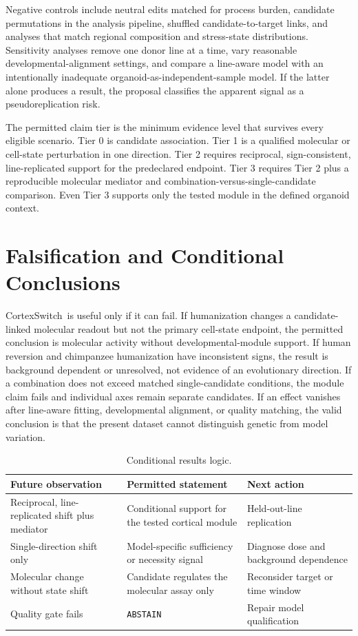 \documentclass[conference]{IEEEtran}
\newcommand{\csw}{CortexSwitch}
\newcommand{\abstain}{\texttt{ABSTAIN}}
\begin{document}
Negative controls include neutral edits matched for process burden, candidate permutations in the analysis pipeline, shuffled candidate-to-target links, and analyses that match regional composition and stress-state distributions. Sensitivity analyses remove one donor line at a time, vary reasonable developmental-alignment settings, and compare a line-aware model with an intentionally inadequate organoid-as-independent-sample model. If the latter alone produces a result, the proposal classifies the apparent signal as a pseudoreplication risk.

The permitted claim tier is the minimum evidence level that survives every eligible scenario. Tier 0 is candidate association. Tier 1 is a qualified molecular or cell-state perturbation in one direction. Tier 2 requires reciprocal, sign-consistent, line-replicated support for the predeclared endpoint. Tier 3 requires Tier 2 plus a reproducible molecular mediator and combination-versus-single-candidate comparison. Even Tier 3 supports only the tested module in the defined organoid context.

\section{Falsification and Conditional Conclusions}

\csw{}~is useful only if it can fail. If humanization changes a candidate-linked molecular readout but not the primary cell-state endpoint, the permitted conclusion is molecular activity without developmental-module support. If human reversion and chimpanzee humanization have inconsistent signs, the result is background dependent or unresolved, not evidence of an evolutionary direction. If a combination does not exceed matched single-candidate conditions, the module claim fails and individual axes remain separate candidates. If an effect vanishes after line-aware fitting, developmental alignment, or quality matching, the valid conclusion is that the present dataset cannot distinguish genetic from model variation.

\begin{table}[t]
\caption{Conditional results logic.}
\label{tab:logic}
\centering
\scriptsize
\renewcommand{\arraystretch}{1.08}
\begin{tabular}{|p{}|p{}|p{}|}
\hline
\textbf{Future observation} & \textbf{Permitted statement} & \textbf{Next action} \\
\hline
Reciprocal, line-replicated shift plus mediator & Conditional support for the tested cortical module & Held-out-line replication \\
\hline
Single-direction shift only & Model-specific sufficiency or necessity signal & Diagnose dose and background dependence \\
\hline
Molecular change without state shift & Candidate regulates the molecular assay only & Reconsider target or time window \\
\hline
Quality gate fails & \abstain{} & Repair model qualification \\
\hline
\end{tabular}
\end{table}
\end{document}
